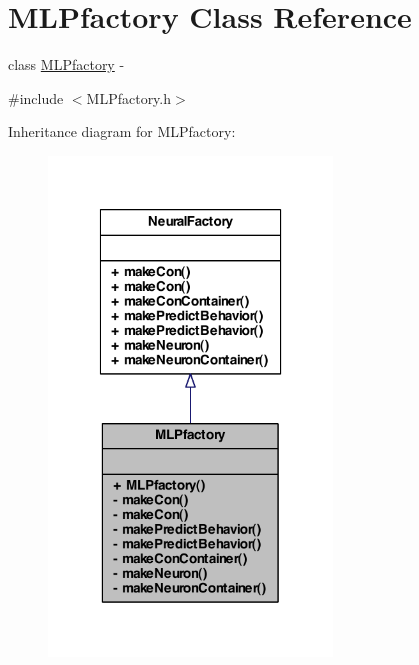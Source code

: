 \hypertarget{class_m_l_pfactory}{
\section{MLPfactory Class Reference}
\label{class_m_l_pfactory}
}


class \hyperlink{class_m_l_pfactory}{MLPfactory} -\/  




{\ttfamily \#include $<$MLPfactory.h$>$}



Inheritance diagram for MLPfactory:
\nopagebreak
\begin{figure}[H]
\begin{center}
\leavevmode
\includegraphics[width=214pt]{class_m_l_pfactory__inherit__graph}
\end{center}
\end{figure}


